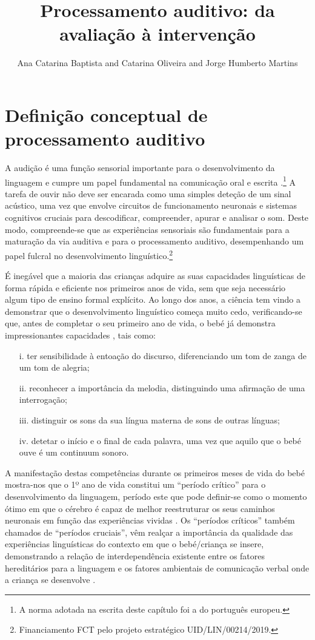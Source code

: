 \documentclass[output=paper,colorlinks,citecolor=brown,booklanguage=portuguese]{langscibook}
\title{Processamento auditivo: da avaliação à intervenção}
\author{Ana Catarina Baptista \affiliation{Universidade do Algarve; Centro de Linguística da Universidade de Lisboa} and  Catarina Oliveira\affiliation{Universidade de Aveiro} and  Jorge Humberto Martins\affiliation{Centro Hospitalar Universitário de Coimbra, E.P.E}}
\begin{document}
\maketitle

\section{Definição conceptual de processamento auditivo}
A audição é uma função sensorial importante para o desenvolvimento da linguagem e cumpre um papel fundamental na comunicação oral e escrita \citep{Terto2011}.\footnote{A norma adotada na escrita deste capítulo foi a do português europeu.}
A tarefa de ouvir não deve ser encarada como uma simples deteção de um sinal acústico, uma vez que envolve circuitos de funcionamento neuronais e sistemas cognitivos cruciais para descodificar, compreender, apurar e analisar o som. Deste modo, compreende-se que as experiências sensoriais são fundamentais para a maturação da via auditiva e para o processamento auditivo, desempenhando um papel fulcral no desenvolvimento linguístico.\footnote{Financiamento FCT pelo projeto estratégico UID/LIN/00214/2019.}

É inegável que a maioria das crianças adquire as suas capacidades linguísticas de forma rápida e eficiente nos primeiros anos de vida, sem que seja necessário algum tipo de ensino formal explícito. Ao longo dos anos, a ciência tem vindo a demonstrar que o desenvolvimento linguístico começa muito cedo, verifican\-do-se que, antes de completar o seu primeiro ano de vida, o bebé já demonstra impressionantes capacidades \citep{Frota2017}, tais como:

\begin{enumerate}
    \item [i.]	ter sensibilidade à entoação do discurso, diferenciando um tom de zanga de um tom de alegria;  
\item[ii.]	reconhecer a importância da melodia, distinguindo uma afirmação de uma interrogação;
\item [iii.]	distinguir os sons da sua língua materna de sons de outras línguas;
\item[iv.]	detetar o início e o final de cada palavra, uma vez que aquilo que o bebé ouve é um continuum sonoro. 
\end{enumerate}
A manifestação destas competências durante os primeiros meses de vida do bebé mostra-nos que o 1º ano de vida constitui um “período crítico” para o desenvolvimento da linguagem, período este que pode definir-se como o momento ótimo em que o cérebro é capaz de melhor reestruturar os seus caminhos neuronais em função das experiências vividas \citep{Zhao2016}. Os “períodos críticos” também chamados de “períodos cruciais”, vêm realçar a importância da qualidade das experiências linguísticas do contexto em que o bebé/criança se insere, demonstrando a relação de interdependência existente entre os fatores hereditários para a linguagem e os fatores ambientais de comunicação verbal onde a criança se desenvolve \citep{SimSim2008}. 
\end{document}
